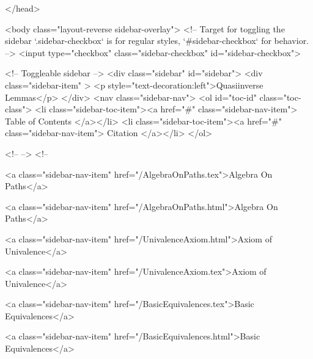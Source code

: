 </head>


  <body class="layout-reverse sidebar-overlay">
    <!-- Target for toggling the sidebar `.sidebar-checkbox` is for regular
     styles, `#sidebar-checkbox` for behavior. -->
<input type="checkbox" class="sidebar-checkbox" id="sidebar-checkbox">

<!-- Toggleable sidebar -->
<div class="sidebar" id="sidebar">
  <div class="sidebar-item" >
    <p style="text-decoration:left">Quasiinverse Lemmas</p>
  </div>
  <nav class="sidebar-nav">
    <ol id="toc-id" class="toc-class">
  <li class="sidebar-toc-item"><a href="#" class="sidebar-nav-item"> Table of Contents </a></li>
  <li class="sidebar-toc-item"><a href="#" class="sidebar-nav-item"> Citation </a></li>
</ol>


    <!--  -->
    <!-- 
      
    
      
    
      
    
      
        
      
    
      
        
          <a class="sidebar-nav-item" href="/AlgebraOnPaths.tex">Algebra On Paths</a>
        
      
    
      
        
          <a class="sidebar-nav-item" href="/AlgebraOnPaths.html">Algebra On Paths</a>
        
      
    
      
        
          <a class="sidebar-nav-item" href="/UnivalenceAxiom.html">Axiom of Univalence</a>
        
      
    
      
        
          <a class="sidebar-nav-item" href="/UnivalenceAxiom.tex">Axiom of Univalence</a>
        
      
    
      
        
          <a class="sidebar-nav-item" href="/BasicEquivalences.tex">Basic Equivalences</a>
        
      
    
      
        
          <a class="sidebar-nav-item" href="/BasicEquivalences.html">Basic Equivalences</a>
        
      
    
      
        
